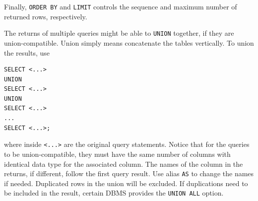 Finally, \verb|ORDER BY| and \verb|LIMIT| controls the sequence and maximum number of returned rows, respectively.

The returns of multiple queries might be able to \verb|UNION| together, if they are union-compatible. Union simply means concatenate the tables vertically. To union the results, use
\begin{lstlisting}
SELECT <...>
UNION
SELECT <...>
UNION
SELECT <...>
...
SELECT <...>;
\end{lstlisting}
where inside \verb|<...>| are the original query statements. Notice that for the queries to be union-compatible, they must have the same number of columns with identical data type for the associated column. The names of the column in the returns, if different, follow the first query result. Use alias \verb|AS| to change the names if needed. Duplicated rows in the union will be excluded. If duplications need to be included in the result, certain DBMS provides the \verb|UNION ALL| option.


